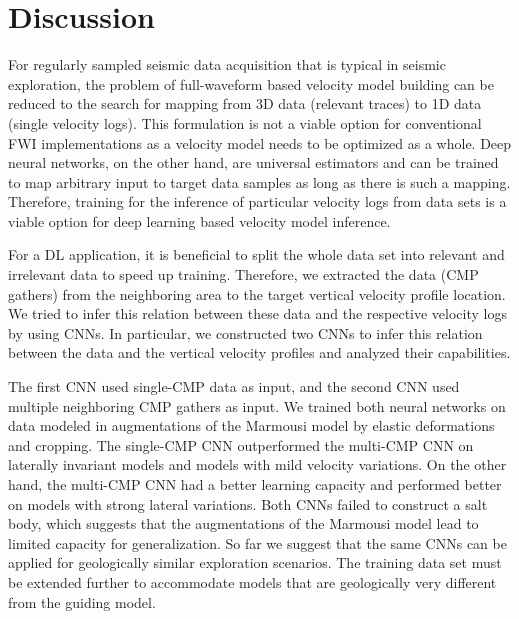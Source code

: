 \documentclass[paper,twocolomn]{geophysics}
\begin{document}



\section{Discussion}

For regularly sampled seismic data acquisition that is typical in seismic exploration, the problem of full-waveform based velocity model building can be reduced to the search for mapping from 3D data (relevant traces) to 1D data (single velocity logs). This formulation is not a viable option for conventional FWI implementations as a velocity model needs to be optimized as a whole. Deep neural networks, on the other hand, are universal estimators and can be trained to map arbitrary input to target data samples as long as there is such a mapping. Therefore, training for the inference of particular velocity logs from data sets is a viable option for deep learning based velocity model inference.

For a DL application, it is beneficial to split the whole data set into relevant and irrelevant data to speed up training. Therefore, we extracted the data (CMP gathers) from the neighboring area to the target vertical velocity profile location. We tried to infer this relation between these data and the respective velocity logs by using CNNs. In particular, we constructed two CNNs to infer this relation between the data and the vertical velocity profiles and analyzed their capabilities.

The first CNN used single-CMP data as input, and the second CNN used multiple neighboring CMP gathers as input. We trained both neural networks on data modeled in augmentations of the Marmousi model by elastic deformations and cropping. The single-CMP CNN outperformed the multi-CMP CNN on laterally invariant models and models with mild velocity variations. On the other hand, the multi-CMP CNN had a better learning capacity and performed better on models with strong lateral variations. Both CNNs failed to construct a salt body, which suggests that the augmentations of the Marmousi model lead to limited capacity for generalization. So far we suggest that the same CNNs can be applied for geologically similar exploration scenarios. The training data set must be extended further to accommodate models that are geologically very different from the guiding model. 
\end{document}
